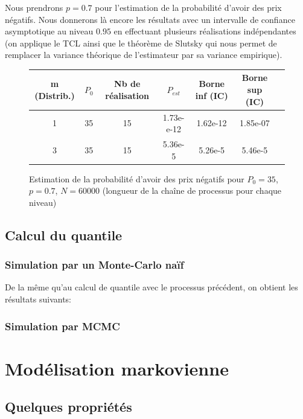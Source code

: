 \documentclass[a4paper,11pt]{article}
\begin{document}
Nous prendrons $p=0.7$ pour l'estimation de la probabilité d'avoir des prix négatifs. Nous donnerons là encore les résultats avec un intervalle de confiance asymptotique au niveau $0.95$ en effectuant plusieurs réalisations indépendantes (on applique le TCL ainsi que le théorème de Slutsky qui nous permet de remplacer la variance théorique de l'estimateur par sa variance empirique).

\begin{figure}
\begin{center}
\caption{Estimation de la probabilité d'avoir des prix négatifs pour $P_0=35$, $p=0.7$, $N=60000$ (longueur de la chaîne de processus pour chaque niveau)} 
\begin{tabular}{|c|c|c|c|c|c|c|}
\hline
m (Distrib.) & $P_{0}$ & Nb de réalisation & $P_{est}$ & Borne inf (IC) & Borne sup (IC) \\
\hline
1 & 35 & 15 & 1.73e-e-12 & 1.62e-12 & 1.85e-07 \\
\hline
3 & 35 & 15 & 5.36e-5 & 5.26e-5 & 5.46e-5 \\
\hline
\end{tabular}
\end{center}
\end{figure}

\subsection{Calcul du quantile}

\subsubsection{Simulation par un Monte-Carlo naïf}
De la même qu'au calcul de quantile avec le processus précédent, on obtient les résultats suivants:

\subsubsection{Simulation par MCMC}

\section{Modélisation markovienne}

\subsection{Quelques propriétés}
\end{document}
